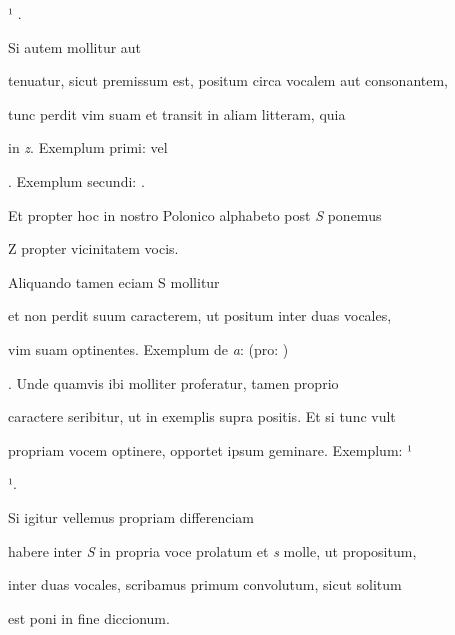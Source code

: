 ¹   .

\indentK Si autem mollitur aut 

\fulllines
tenuatur, sicut premissum est, positum circa vocalem aut consonantem,

tunc perdit vim suam et transit in aliam litteram, quia 

in \textit{z}. Exemplum primi:  vel  

 . Exemplum secundi:   .

Et propter hoc in nostro Polonico alphabeto post \textit{S} ponemus 

\splitlines

Z propter vicinitatem vocis.

\indentK Aliquando tamen eciam S mollitur 

\fulllines

et non perdit suum caracterem, ut positum inter duas vocales, 

vim suam optinentes. Exemplum de \textit{a}:   (pro: ) 

. Unde quamvis ibi molliter proferatur, tamen proprio 

caractere seribitur, ut in exemplis supra positis. Et si tunc vult

propriam vocem optinere, opportet ipsum geminare. Exemplum: ¹

\newpage
\splitlines

 ¹.

\indentK Si igitur vellemus propriam differenciam 

\fulllines

habere inter \textit{S} in propria voce prolatum et \textit{s} molle, ut propositum,





\fullpreviouslines

{
\color{blue}

inter duas vocales, scribamus primum convolutum, sicut solitum

est poni in fine diccionum. 

}


